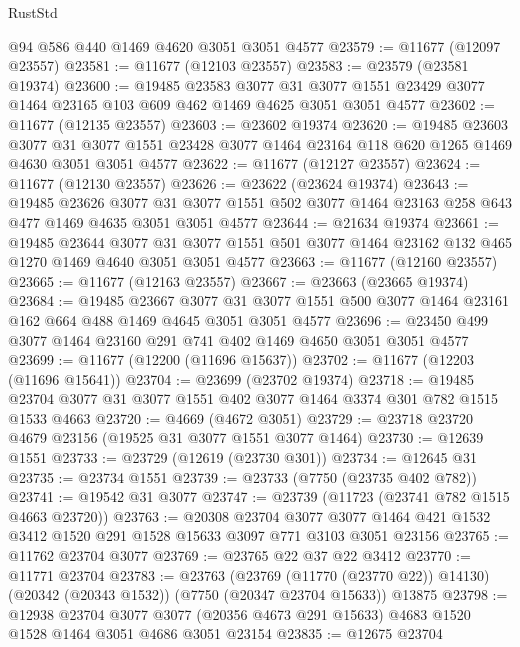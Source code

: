 \begin{lexlean}{RustStd}
\begin{coremodule}
    @94
    @586
    @440
    @1469
    @4620
    @3051
    @3051
    @4577
@23579 := @11677 (@12097 @23557)
@23581 := @11677 (@12103 @23557)
@23583 := @23579 (@23581 @19374)
@23600 := @19485
    @23583
    @3077
    @31
    @3077
    @1551
    @23429
    @3077
    @1464
    @23165
    @103
    @609
    @462
    @1469
    @4625
    @3051
    @3051
    @4577
@23602 := @11677 (@12135 @23557)
@23603 := @23602 @19374
@23620 := @19485
    @23603
    @3077
    @31
    @3077
    @1551
    @23428
    @3077
    @1464
    @23164
    @118
    @620
    @1265
    @1469
    @4630
    @3051
    @3051
    @4577
@23622 := @11677 (@12127 @23557)
@23624 := @11677 (@12130 @23557)
@23626 := @23622 (@23624 @19374)
@23643 := @19485
    @23626
    @3077
    @31
    @3077
    @1551
    @502
    @3077
    @1464
    @23163
    @258
    @643
    @477
    @1469
    @4635
    @3051
    @3051
    @4577
@23644 := @21634 @19374
@23661 := @19485
    @23644
    @3077
    @31
    @3077
    @1551
    @501
    @3077
    @1464
    @23162
    @132
    @465
    @1270
    @1469
    @4640
    @3051
    @3051
    @4577
@23663 := @11677 (@12160 @23557)
@23665 := @11677 (@12163 @23557)
@23667 := @23663 (@23665 @19374)
@23684 := @19485
    @23667
    @3077
    @31
    @3077
    @1551
    @500
    @3077
    @1464
    @23161
    @162
    @664
    @488
    @1469
    @4645
    @3051
    @3051
    @4577
@23696 := @23450 @499 @3077 @1464 @23160 @291 @741 @402 @1469 @4650 @3051 @3051 @4577
@23699 := @11677 (@12200 (@11696 @15637))
@23702 := @11677 (@12203 (@11696 @15641))
@23704 := @23699 (@23702 @19374)
@23718 := @19485 @23704 @3077 @31 @3077 @1551 @402 @3077 @1464 @3374 @301 @782 @1515 @1533 @4663
@23720 := @4669 (@4672 @3051)
@23729 := @23718 @23720 @4679 @23156 (@19525 @31 @3077 @1551 @3077 @1464)
@23730 := @12639 @1551
@23733 := @23729 (@12619 (@23730 @301))
@23734 := @12645 @31
@23735 := @23734 @1551
@23739 := @23733 (@7750 (@23735 @402 @782))
@23741 := @19542 @31 @3077
@23747 := @23739 (@11723 (@23741 @782 @1515 @4663 @23720))
@23763 := @20308
    @23704
    @3077
    @3077
    @1464
    @421
    @1532
    @3412
    @1520
    @291
    @1528
    @15633
    @3097
    @771
    @3103
    @3051
    @23156
@23765 := @11762 @23704 @3077
@23769 := @23765 @22 @37 @22 @3412
@23770 := @11771 @23704
@23783 := @23763
    (@23769 (@11770 (@23770 @22)) @14130)
    (@20342 (@20343 @1532))
    (@7750 (@20347 @23704 @15633))
    @13875
@23798 := @12938
    @23704
    @3077
    @3077
    (@20356 @4673 @291 @15633)
    @4683
    @1520
    @1528
    @1464
    @3051
    @4686
    @3051
    @23154
@23835 := @12675
    @23704

\end{coremodule}
\end{lexlean}
